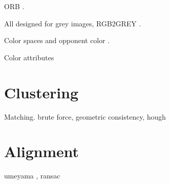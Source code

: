 ORB \cite{ORB}.

All designed for grey images, RGB2GREY \cite{RGB2GREY}.

Color spaces and opponent color \cite{ColorComparison}.

Color attributes \cite{ColorAttributes}


\section{Clustering}
\label{sec:clustering}

Matching.
brute force, geometric consistency, hough


\section{Alignment}
\label{sec:alignment}



umeyama \cite{umeyama}, ransac

